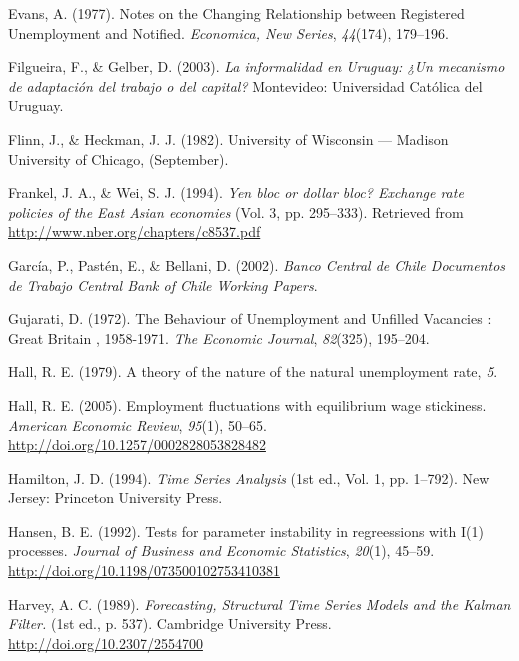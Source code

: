 \documentclass[12pt,oneside]{reedthesis}
\begin{document}
\leavevmode\hypertarget{ref-Evans1977}{}%
Evans, A. (1977). Notes on the Changing Relationship between Registered Unemployment and Notified. \emph{Economica, New Series}, \emph{44}(174), 179--196.

\leavevmode\hypertarget{ref-Filgueira2003}{}%
Filgueira, F., \& Gelber, D. (2003). \emph{La informalidad en Uruguay: ¿Un mecanismo de adaptación del trabajo o del capital?} Montevideo: Universidad Católica del Uruguay.

\leavevmode\hypertarget{ref-Flinn1982}{}%
Flinn, J., \& Heckman, J. J. (1982). University of Wisconsin --- Madison University of Chicago, (September).

\leavevmode\hypertarget{ref-Frankel1994}{}%
Frankel, J. A., \& Wei, S. J. (1994). \emph{Yen bloc or dollar bloc? Exchange rate policies of the East Asian economies} (Vol. 3, pp. 295--333). Retrieved from \url{http://www.nber.org/chapters/c8537.pdf}

\leavevmode\hypertarget{ref-BankChile2002}{}%
García, P., Pastén, E., \& Bellani, D. (2002). \emph{Banco Central de Chile Documentos de Trabajo Central Bank of Chile Working Papers}.

\leavevmode\hypertarget{ref-Gujarati1972}{}%
Gujarati, D. (1972). The Behaviour of Unemployment and Unfilled Vacancies : Great Britain , 1958-1971. \emph{The Economic Journal}, \emph{82}(325), 195--204.

\leavevmode\hypertarget{ref-Hall1979}{}%
Hall, R. E. (1979). A theory of the nature of the natural unemployment rate, \emph{5}.

\leavevmode\hypertarget{ref-Hall2005}{}%
Hall, R. E. (2005). Employment fluctuations with equilibrium wage stickiness. \emph{American Economic Review}, \emph{95}(1), 50--65. \url{http://doi.org/10.1257/0002828053828482}

\leavevmode\hypertarget{ref-Hamilton1994}{}%
Hamilton, J. D. (1994). \emph{Time Series Analysis} (1st ed., Vol. 1, pp. 1--792). New Jersey: Princeton University Press.

\leavevmode\hypertarget{ref-Hansen1992}{}%
Hansen, B. E. (1992). Tests for parameter instability in regreessions with I(1) processes. \emph{Journal of Business and Economic Statistics}, \emph{20}(1), 45--59. \url{http://doi.org/10.1198/073500102753410381}

\leavevmode\hypertarget{ref-Harvey1989}{}%
Harvey, A. C. (1989). \emph{Forecasting, Structural Time Series Models and the Kalman Filter.} (1st ed., p. 537). Cambridge University Press. \url{http://doi.org/10.2307/2554700}
\end{document}
